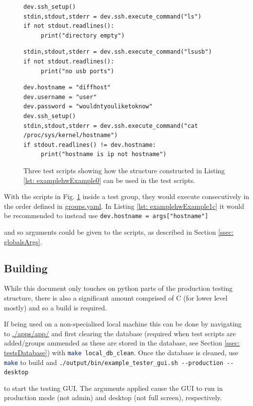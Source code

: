 \documentclass[a4paper,12pt, notitlepage]{article}
\begin{document}
{{{{{{{{{{{{{\begin{figure}[h]
	\begin{lstlisting}[caption={Simple script to setup ssh then use `ls' to remote.},label={lst: examplehwExample1a}]
dev.ssh_setup()
stdin,stdout,stderr = dev.ssh.execute_command("ls")
if not stdout.readlines():
     print("directory empty")
	\end{lstlisting}
	\begin{lstlisting}[caption={Using the existing ssh connection, this script checks usb ports.}, label={lst: examplehwExample1b}]
stdin,stdout,stderr = dev.ssh.execute_command("lsusb")
if not stdout.readlines():
     print("no usb ports")
	\end{lstlisting}
	\begin{lstlisting}[caption={This script changes some class attributes and opens a new ssh connection to a different remote.},label={lst: examplehwExample1c}]
dev.hostname = "diffhost"
dev.username = "user"
dev.password = "wouldntyouliketoknow"
dev.ssh_setup()
stdin,stdout,stderr = dev.ssh.execute_command("cat /proc/sys/kernel/hostname")
if stdout.readlines() != dev.hostname:
     print("hostname is ip not hostname")
     \end{lstlisting}
     \caption{Three test scripts showing how the structure constructed in Listing \ref{lst: examplehwExample0} can be used in the test scripts.}
     \label{lst: examplehwExample1}
\end{figure} 

With the scripts in Fig. \ref{lst: examplehwExample1} inside a test group, they would execute consecutively in the order defined in \url{groups.yaml}. In Listing \ref{lst: examplehwExample1c} it would be recommended to instead use \lstinline{dev.hostname = args["hostname"]}{ and so arguments could be given to the scripts, as described in Section \ref{ssec: globalsArgs}.
\newpage
\subsection{Building}
\label{ssec: buildingStruct}

While this document only touches on python parts of the production testing structure, there is also a significant amount comprised of C (for lower level mostly) and so a build is required. 

If being used on a non-specialised local machine this can be done by navigating to \url{./apps/app/} and first clearing the database (required when test scripts are added/groups ammended as these are stored in the database, see Section \ref{ssec: testsDatabase}) with \lstinline[language=bash]{make local_db_clean}. Once the database is cleaned, use \lstinline[language=bash]{make} to build and \lstinline{./output/bin/example_tester_gui.sh --production --desktop}{ to start the testing GUI. The arguments applied cause the GUI to run in production mode (not admin) and desktop (not full screen), respectively. 

}}}}}}}}}}}}}}}
\end{document}

